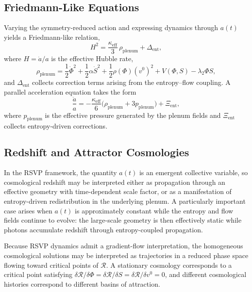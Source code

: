 \documentclass[12pt,a4paper]{article}
\theoremstyle{plain}
\theoremstyle{definition}
\theoremstyle{remark}
\begin{document}
\subsection{Friedmann-Like Equations}

Varying the symmetry-reduced action and expressing dynamics through
$a(t)$ yields a Friedmann-like relation,
\begin{equation}
H^2 = \frac{\kappa_{\mathrm{eff}}}{3}\,\rho_{\mathrm{plenum}}
+ \Delta_{\mathrm{ent}},
\end{equation}
where $H = \dot{a}/a$ is the effective Hubble rate,
\begin{equation}
\rho_{\mathrm{plenum}} =
\frac{1}{2}\dot{\Phi}^2
+ \frac{1}{2}\alpha\dot{S}^2
+ \frac{1}{2}\rho(\Phi)(v^0)^2
+ V(\Phi,S) - \lambda_2\Phi S,
\end{equation}
and $\Delta_{\mathrm{ent}}$ collects correction terms arising from the
entropy--flow coupling. A parallel acceleration equation takes the form
\begin{equation}
\frac{\ddot{a}}{a} =
-\frac{\kappa_{\mathrm{eff}}}{6}
\bigl(\rho_{\mathrm{plenum}} + 3p_{\mathrm{plenum}}\bigr)
+ \Xi_{\mathrm{ent}},
\end{equation}
where $p_{\mathrm{plenum}}$ is the effective pressure generated by the
plenum fields and $\Xi_{\mathrm{ent}}$ collects entropy-driven
corrections.

\subsection{Redshift and Attractor Cosmologies}

In the RSVP framework, the quantity $a(t)$ is an emergent collective
variable, so cosmological redshift may be interpreted either as
propagation through an effective geometry with time-dependent scale
factor, or as a manifestation of entropy-driven redistribution in the
underlying plenum. A particularly important case arises when $a(t)$ is
approximately constant while the entropy and flow fields continue to
evolve: the large-scale geometry is then effectively static while
photons accumulate redshift through entropy-coupled propagation.

Because RSVP dynamics admit a gradient-flow interpretation, the
homogeneous cosmological solutions may be interpreted as trajectories
in a reduced phase space flowing toward critical points of
$\mathcal{R}$. A stationary cosmology corresponds to a critical point
satisfying $\delta\mathcal{R}/\delta\Phi =
\delta\mathcal{R}/\delta S = \delta\mathcal{R}/\delta v^0 = 0$, and
different cosmological histories correspond to different basins of
attraction.
\end{document}
